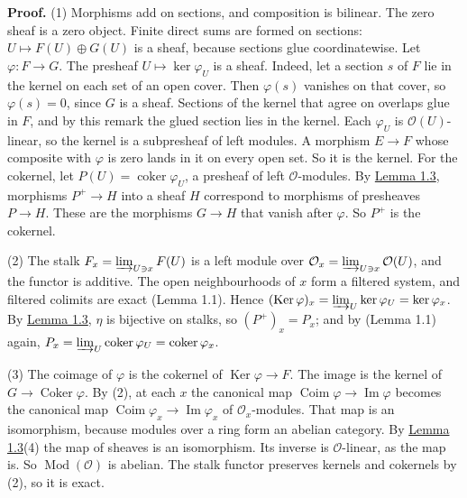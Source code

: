 \documentclass[
  english,
  11pt,
  a4paper,
]{article}
\begin{document}
\textbf{Proof.} (1) Morphisms add on sections, and composition is
bilinear. The zero sheaf is a zero object. Finite direct sums are formed
on sections: \(U\mapsto F(U)\oplus G(U)\) is a sheaf, because sections
glue coordinatewise. Let \(\varphi:F\to G\). The presheaf
\(U\mapsto\ker\varphi_U\) is a sheaf. Indeed, let a section \(s\) of
\(F\) lie in the kernel on each set of an open cover. Then
\(\varphi(s)\) vanishes on that cover, so \(\varphi(s)=0\), since \(G\)
is a sheaf. Sections of the kernel that agree on overlaps glue in \(F\),
and by this remark the glued section lies in the kernel. Each
\(\varphi_U\) is \(\mathcal O(U)\)-linear, so the kernel is a
subpresheaf of left modules. A morphism \(E\to F\) whose composite with
\(\varphi\) is zero lands in it on every open set. So it is the kernel.
For the cokernel, let \(P(U)=\operatorname{coker}\varphi_U\), a presheaf
of left \(\mathcal O\)-modules. By
\hyperref[sheaves-of-modules-on-a-ringed-space--sheafification-and-the-stalk-test]{Lemma
1.3}, morphisms \(P^+\to H\) into a sheaf \(H\) correspond to morphisms
of presheaves \(P\to H\). These are the morphisms \(G\to H\) that vanish
after \(\varphi\). So \(P^+\) is the cokernel.

(2) The stalk \(F_x=\varinjlim_{U\ni x}F(U)\) is a left module over
\(\mathcal O_x=\varinjlim_{U\ni x}\mathcal O(U)\), and the functor is
additive. The open neighbourhoods of \(x\) form a filtered system, and
filtered colimits are exact (Lemma 1.1). Hence
\((\operatorname{Ker}\varphi)_x=\varinjlim_U\ker\varphi_U=\ker\varphi_x\).
By
\hyperref[sheaves-of-modules-on-a-ringed-space--sheafification-and-the-stalk-test]{Lemma
1.3}, \(\eta\) is bijective on stalks, so \((P^+)_x=P_x\); and by (Lemma
1.1) again,
\(P_x=\varinjlim_U\operatorname{coker}\varphi_U=\operatorname{coker}\varphi_x\).

(3) The coimage of \(\varphi\) is the cokernel of
\(\operatorname{Ker}\varphi\to F\). The image is the kernel of
\(G\to\operatorname{Coker}\varphi\). By (2), at each \(x\) the canonical
map \(\operatorname{Coim}\varphi\to\operatorname{Im}\varphi\) becomes
the canonical map
\(\operatorname{Coim}\varphi_x\to\operatorname{Im}\varphi_x\) of
\(\mathcal O_x\)-modules. That map is an isomorphism, because modules
over a ring form an abelian category. By
\hyperref[sheaves-of-modules-on-a-ringed-space--sheafification-and-the-stalk-test]{Lemma
1.3}(4) the map of sheaves is an isomorphism. Its inverse is
\(\mathcal O\)-linear, as the map is. So
\(\operatorname{Mod}(\mathcal O)\) is abelian. The stalk functor
preserves kernels and cokernels by (2), so it is exact.
\end{document}
